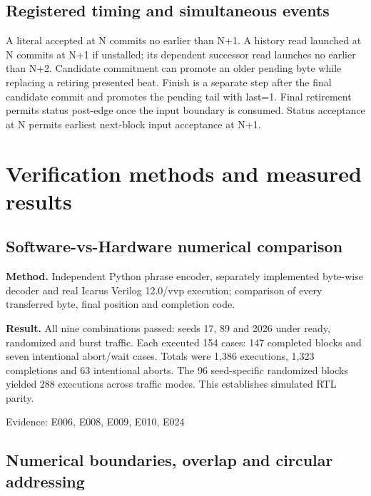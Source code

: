 \documentclass[11pt,a4paper]{article}
\begin{document}
\subsection{Registered timing and simultaneous events}

A literal accepted at N commits no earlier than N+\allowbreak{}1. A history read launched at N commits at N+\allowbreak{}1 if unstalled; its dependent successor read launches no earlier than N+\allowbreak{}2. Candidate commitment can promote an older pending byte while replacing a retiring presented beat. Finish is a separate step after the final candidate commit and promotes the pending tail with last=\allowbreak{}1. Final retirement permits status post-edge once the input boundary is consumed. Status acceptance at N permits earliest next-block input acceptance at N+\allowbreak{}1.

\section{Verification methods and measured results}

\subsection{Software-vs-Hardware numerical comparison}

\textbf{Method.} Independent Python phrase encoder,\allowbreak{} separately implemented byte-wise decoder and real Icarus Verilog 12.0/\allowbreak{}vvp execution; comparison of every transferred byte,\allowbreak{} final position and completion code.

\textbf{Result.} All nine combinations passed: seeds 17,\allowbreak{} 89 and 2026 under ready,\allowbreak{} randomized and burst traffic. Each executed 154 cases: 147 completed blocks and seven intentional abort/\allowbreak{}wait cases. Totals were 1,\allowbreak{}386 executions,\allowbreak{} 1,\allowbreak{}323 completions and 63 intentional aborts. The 96 seed-specific randomized blocks yielded 288 executions across traffic modes. This establishes simulated RTL parity.

{\small Evidence: E006,\allowbreak{} E008,\allowbreak{} E009,\allowbreak{} E010,\allowbreak{} E024}

\subsection{Numerical boundaries,\allowbreak{} overlap and circular addressing}
\end{document}
